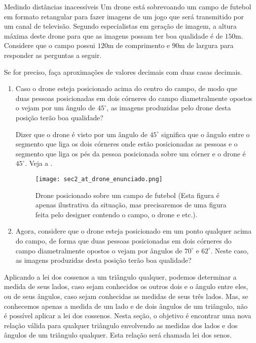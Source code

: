 \begin{task}{Medindo distâncias inacessíveis}
Um drone está sobrevoando um campo de futebol em formato retangular para fazer imagens de um jogo que será transmitido por um canal de televisão. Segundo especialistas em geração de imagem, a altura máxima deste drone para que as imagens possam ter boa qualidade é de $150$m. Considere que o campo possui $120$m de comprimento e $90$m de largura para responder as perguntas a seguir.

Se for preciso, faça aproximações de valores decimais com duas casas decimais.

\begin{enumerate}
    \item{}
    Caso o drone esteja posicionado acima do centro do campo, de modo que duas pessoas posicionadas em dois córneres do campo diametralmente opostos o vejam por um ângulo de $45^\circ$, as imagens produzidas pelo drone desta posição terão boa qualidade?
    
    Dizer que o drone é visto por um ângulo de $45^\circ$ significa que o ângulo entre o segmento que liga os dois córneres onde estão posicionadas as pessoas e o segmento que liga os pés da pessoa posicionada sobre um córner e o drone é $45^\circ$. Veja a .
    \begin{figure}[H]
    \centering
    \texttt{[image: sec2\_at\_drone\_enunciado.png]}
    \caption{Drone posicionado sobre um campo de futebol (Esta figura é apenas ilustrativa da situação, mas precisaremos de uma figura feita pelo designer contendo o campo, o drone e etc.). 
    }
    \label{sec2_leidossenos_atdrone_fig1}
\end{figure}

    
    \item{}
    Agora, considere que o drone esteja posicionado em um ponto qualquer acima do campo, de forma que duas pessoas posicionadas em dois córneres do campo diametralmente opostos o vejam por ângulos de $70^\circ$ e $62^\circ$. Neste caso, as imagens produzidas desta posição terão boa qualidade? 
\end{enumerate}
\end{task}


Aplicando a lei dos cossenos a um triângulo qualquer, podemos determinar a medida de seus lados, caso sejam conhecidos os outros dois e o ângulo entre eles, ou de seus ângulos, caso sejam conhecidas as medidas de seus três lados. Mas, se conhecemos apenas a medida de um lado e de dois ângulos de um triângulo, não é possível aplicar a lei dos cossenos. Nesta seção, o objetivo é encontrar uma nova relação válida para qualquer triângulo envolvendo as medidas dos lados e dos ângulos de um triângulo qualquer.  Esta relação será chamada lei dos senos.

